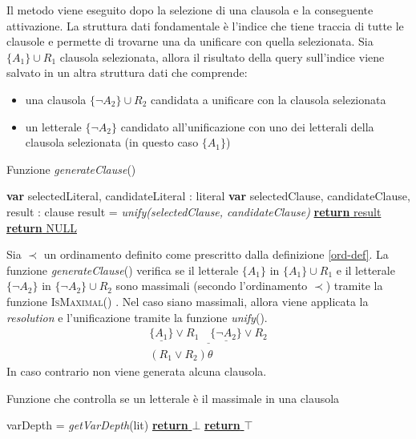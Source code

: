 Il metodo viene eseguito dopo la selezione di una clausola e la conseguente attivazione. La struttura dati fondamentale 
è l'indice che tiene traccia di tutte le clausole e permette di trovarne una da unificare con quella selezionata.
Sia $\{A_1\}\cup R_1$ clausola selezionata, allora il risultato della query sull'indice viene salvato 
in un altra struttura dati che comprende:
\begin{itemize}
    \item una clausola $\{\lnot A_2\}\cup R_2$ candidata a unificare con la clausola selezionata 
    \item un letterale $\{\lnot A_2\}$ candidato all'unificazione con uno dei letterali della clausola selezionata (in questo caso $\{A_1\}$)
\end{itemize} 
\begin{algorithm}[H]
    \caption{Funzione \emph{generateClause}()}
    \begin{algorithmic}
        \State \textbf{var} selectedLiteral, candidateLiteral : literal
        \State \textbf{var} selectedClause, candidateClause, result : clause
            \State result = \emph{unify(selectedClause, candidateClause)}
            \State \underline{\textbf{return} result}
        \Else
            \State \underline{\textbf{return} NULL}
        \EndIf
    \end{algorithmic}
\end{algorithm}
Sia $\prec$ un ordinamento definito come prescritto dalla definizione \ref{ord-def}.
La funzione \emph{generateClause}() verifica se il letterale 
$\{A_1\}$ in $\{A_1\}\cup R_1$ e il letterale $\{\lnot A_2\}$ in $\{\lnot A_2\}\cup R_2$ sono massimali 
(secondo l'ordinamento $\prec$) tramite la funzione \textsc{IsMaximal}() .
Nel caso siano massimali, allora viene applicata la \emph{resolution} e l'unificazione tramite la funzione \emph{unify}().
\begin{equation*}
    \begin{gathered}
        \underline{\{\underline{A_1}\} \lor R_1 \quad\{\underline{\lnot A_2}\}\lor R_2}\\
        (R_1 \lor R_2)\theta
    \end{gathered}
\end{equation*}
In caso contrario non viene generata alcuna clausola.
\begin{algorithm}[H]
    \caption{Funzione che controlla se un letterale è il massimale in una clausola}
    \begin{algorithmic}
                \State varDepth = \emph{getVarDepth}(lit)
                    \State \underline{\textbf{return} $\bot$}
                \EndIf
            \EndFor
            \State \underline{\textbf{return} $\top$}
        \EndFunction
    \end{algorithmic}
\end{algorithm}
